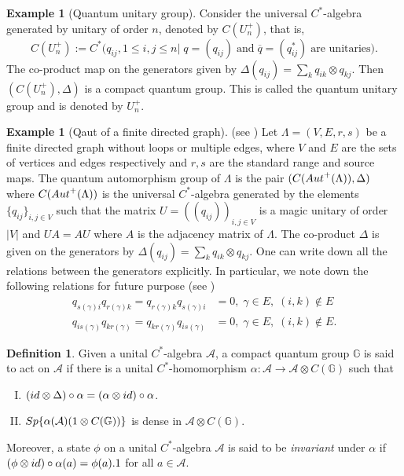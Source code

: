 \documentclass{amsart}
\theoremstyle{plain}
\theoremstyle{definition}
\newtheorem{definition}[subsection]{Definition}
\newtheorem{example}[subsection]{Example}
\theoremstyle{remark}
\numberwithin{equation}{section}
\newcommand{\Dlt}{\Delta}
\newcommand{\cal}{\mathcal}
\newcommand{\cla}{{\cal A}}
\newcommand{\raro}{\rightarrow}
\begin{document}
\begin{example}[Quantum unitary group] Consider the universal $C^{\ast}$-algebra generated by unitary of order $n$, denoted by $C(U_{n}^{+})$, that is, 
\begin{displaymath}C(U_{n}^{+}):=C^{\ast}\Biggl(q_{ij}, 1\leq i,j\leq n|\; q=(q_{ij})\;\text{and} \;\overline{q}=(q_{ij}^{\ast})\; \text{are unitaries}\Biggl).\end{displaymath}
The co-product map on the generators given by $\Dlt(q_{ij})=\sum\limits_{k}q_{ik}\otimes q_{kj}$. Then $(C(U_{n}^{+}),\Dlt)$ is a compact quantum group. This is called the quantum unitary group and is denoted by $U_{n}^{+}$.
\end{example}
\begin{example}[Qaut of a finite directed graph] (see \cite{banica}) Let $\Lambda=(V,E,r,s)$ be a finite directed graph without loops or multiple edges, where $V$ and $E$ are the sets of vertices and edges respectively and $r,s$ are the standard range and source maps. The quantum automorphism group of $\Lambda$ is the pair $(C({\rm Aut}^{+}(\Lambda)),\Delta)$ where $C({\rm Aut}^{+}(\Lambda))$ is the universal $C^{\ast}$-algebra generated by the elements $\{q_{ij}\}_{i,j\in V}$ such that the matrix $U=((q_{ij}))_{i,j\in V}$ is a magic unitary of order $|V|$ and $UA=AU$ where $A$ is the adjacency matrix of $\Lambda$. The co-product $\Delta$ is given on the generators by $\Delta(q_{ij})=\sum_{k}q_{ik}\otimes q_{kj}$. One can write down all the relations between the generators explicitly. In particular, we note down the following relations for future purpose (see \cite{fulton})
    \begin{eqnarray}
    \label{qaut_equ}
        q_{s(\gamma)i}q_{r(\gamma)k} =q_{r(\gamma)k} q_{s(\gamma)i}&=0,\; \gamma\in E,\; (i,k)\notin E \nonumber \\
        q_{is(\gamma)}q_{kr(\gamma)} =q_{kr(\gamma)} q_{is(\gamma)}&=0,\; \gamma\in E,\; (i,k)\notin E.
    \end{eqnarray}
\end{example}
\begin{definition}
    Given a unital $C^{\ast}$-algebra $\cla$, a compact quantum group $\mathbb{G}$ is said to act on $\cla$ if there is a unital $C^{\ast}$-homomorphism $\alpha:\cla\raro\cla\otimes C(\mathbb{G})$ such that
    \begin{enumerate}[(I)]
    \setlength\itemsep{0.5em}
    \item $(\rm{id}\otimes \Dlt)\circ \alpha=(\alpha \otimes \rm{id})\circ \alpha$.
    \item ${\rm Sp}\{\alpha(\cla)(1\otimes C(\mathbb{G}))\}$ is dense in $\cla\otimes C(\mathbb{G})$.
\end{enumerate}
\end{definition}
Moreover, a state $\phi$ on a unital $C^{\ast}$-algebra $\mathcal{A}$ is said to be \textit{invariant} under $\alpha$ if  
    $(\phi\otimes {\rm id})\circ \alpha(a)=\phi(a).1$ for all $a\in \mathcal{A}$.
\end{document}
